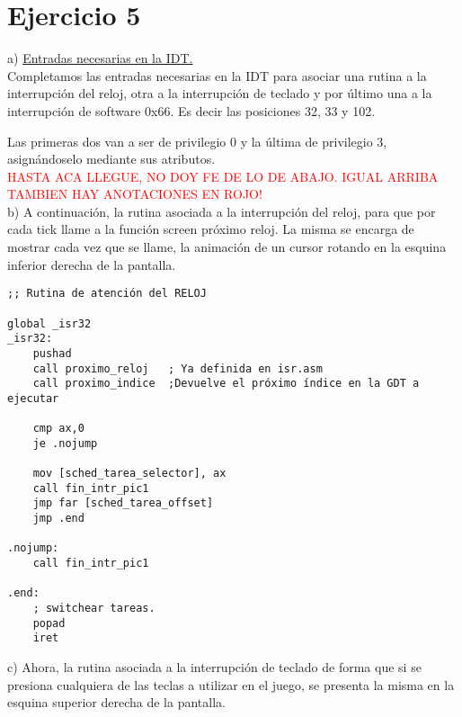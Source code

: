\documentclass[a4paper]{article}
\begin{document}
\newpage
\section{Ejercicio 5}

{\large a)} \underline{Entradas necesarias en la IDT.}\\

Completamos las entradas necesarias en la IDT para asociar una rutina a la interrupci\'on del
reloj, otra a la interrupci\'on de teclado y por \'ultimo una a la interrupci\'on de software 0x66. Es decir las posiciones 32, 33 y 102.

Las primeras dos van a ser de privilegio 0 y la \'ultima de privilegio 3, asign\'andoselo mediante sus atributos.\\

\textcolor{red}{HASTA ACA LLEGUE, NO DOY FE DE LO DE ABAJO. IGUAL ARRIBA TAMBIEN HAY ANOTACIONES EN ROJO!}\\

{\large b)} A continuación, la rutina asociada a la interrupci\'on del reloj, para que por cada tick llame a la
funci\'on screen pr\'oximo reloj. La misma se encarga de mostrar cada vez que se llame, la
animaci\'on de un cursor rotando en la esquina inferior derecha de la pantalla. 

\begin{codesnippet}
\begin{verbatim}
;; Rutina de atención del RELOJ

global _isr32
_isr32:
    pushad
    call proximo_reloj 	 ; Ya definida en isr.asm
    call proximo_indice  ;Devuelve el próximo índice en la GDT a ejecutar

    cmp ax,0
    je .nojump

    mov [sched_tarea_selector], ax
    call fin_intr_pic1
    jmp far [sched_tarea_offset]
    jmp .end

.nojump:
    call fin_intr_pic1

.end:
    ; switchear tareas.
    popad
    iret
\end{verbatim}
\end{codesnippet}


{\large c)} Ahora, la rutina asociada a la interrupci\'on de teclado de forma que si se presiona cualquiera
de las teclas a utilizar en el juego, se presenta la misma en la esquina superior derecha de la pantalla. \\
\end{document}

